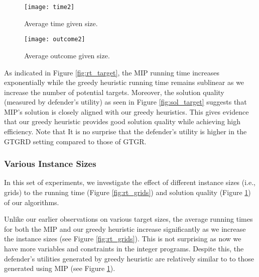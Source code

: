 \begin{figure}[!ht]
\begin{center}
\begin{minipage}{0.48\linewidth}
\texttt{[image: time2]}
\caption{Average time given size.}
\label{fig:rt_grids}
\end{minipage}%
\hfill
\begin{minipage}{0.49\linewidth}
\texttt{[image: outcome2]}
\caption{Average outcome given size.}
\label{fig:sol_grids}
\end{minipage}
\end{center}
\end{figure}

As indicated in Figure \ref{fig:rt_target}, the MIP running time 
increases exponentially while the greedy heuristic running time 
remains sublinear as we increase the number of potential targets. 
Moreover, the solution quality (measured by defender's utility) 
as seen in Figure \ref{fig:sol_target} suggests that 
MIP's solution is closely aligned with our greedy heuristics. 
This gives evidence that our greedy heuristic provides good solution quality 
while achieving high efficiency. 
Note that It is no surprise that the 
defender's utility is higher in the GTGRD setting 
compared to those of GTGR. 

\subsubsection{Various Instance Sizes}
In this set of experiments, we investigate 
the effect of different instance sizes (i.e., grids) 
to the running time (Figure \ref{fig:rt_grids}) 
and solution quality (Figure \ref{fig:sol_grids}) of our algorithms. 

Unlike our earlier observations on various target sizes, 
the average running times for both the MIP and our greedy heuristic 
increase significantly as we increase the instance sizes (see Figure \ref{fig:rt_grids}). 
This is not surprising as now we have more variables 
and constraints in the integer programs. 
Despite this, the defender's utilities generated by greedy heuristic are relatively 
similar to to those generated using MIP (see Figure \ref{fig:sol_grids}). 

